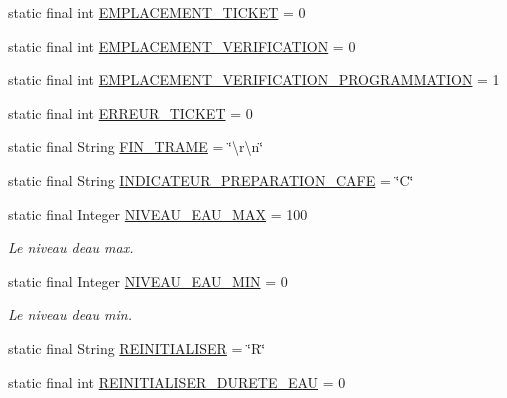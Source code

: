 \begin{DoxyCompactItemize}
\item 
static final int \hyperlink{classcom_1_1example_1_1ekawa_1_1_protocole_a6250b8095974b868336c880dc5c68f7f}{E\+M\+P\+L\+A\+C\+E\+M\+E\+N\+T\+\_\+\+T\+I\+C\+K\+ET} = 0
\item 
static final int \hyperlink{classcom_1_1example_1_1ekawa_1_1_protocole_ae76a20c0852f58c7dd77110816d8d809}{E\+M\+P\+L\+A\+C\+E\+M\+E\+N\+T\+\_\+\+V\+E\+R\+I\+F\+I\+C\+A\+T\+I\+ON} = 0
\item 
static final int \hyperlink{classcom_1_1example_1_1ekawa_1_1_protocole_aab437189a20d6f6447262ed50c666bde}{E\+M\+P\+L\+A\+C\+E\+M\+E\+N\+T\+\_\+\+V\+E\+R\+I\+F\+I\+C\+A\+T\+I\+O\+N\+\_\+\+P\+R\+O\+G\+R\+A\+M\+M\+A\+T\+I\+ON} = 1
\item 
static final int \hyperlink{classcom_1_1example_1_1ekawa_1_1_protocole_a18dec2fc4aa359cbcb7a7fe04ea5614a}{E\+R\+R\+E\+U\+R\+\_\+\+T\+I\+C\+K\+ET} = 0
\item 
static final String \hyperlink{classcom_1_1example_1_1ekawa_1_1_protocole_aece1e2c0e4110c3d91fb69da213e847f}{F\+I\+N\+\_\+\+T\+R\+A\+ME} = \char`\"{}\textbackslash{}r\textbackslash{}n\char`\"{}
\item 
static final String \hyperlink{classcom_1_1example_1_1ekawa_1_1_protocole_acb81150b5809d8635dd3301fa376a1d6}{I\+N\+D\+I\+C\+A\+T\+E\+U\+R\+\_\+\+P\+R\+E\+P\+A\+R\+A\+T\+I\+O\+N\+\_\+\+C\+A\+FE} = \char`\"{}C\char`\"{}
\item 
static final Integer \hyperlink{classcom_1_1example_1_1ekawa_1_1_protocole_a4318fa7c5638fd5da231029d1e2e9c99}{N\+I\+V\+E\+A\+U\+\_\+\+E\+A\+U\+\_\+\+M\+AX} = 100
\begin{DoxyCompactList}\small\item\em Le niveau d\textquotesingle{}eau max. \end{DoxyCompactList}\item 
static final Integer \hyperlink{classcom_1_1example_1_1ekawa_1_1_protocole_abba816d4dfe88be3a873669f2056aecc}{N\+I\+V\+E\+A\+U\+\_\+\+E\+A\+U\+\_\+\+M\+IN} = 0
\begin{DoxyCompactList}\small\item\em Le niveau d\textquotesingle{}eau min. \end{DoxyCompactList}\item 
static final String \hyperlink{classcom_1_1example_1_1ekawa_1_1_protocole_add67f8989ac6672f498b8c9f085cd445}{R\+E\+I\+N\+I\+T\+I\+A\+L\+I\+S\+ER} = \char`\"{}R\char`\"{}
\item 
static final int \hyperlink{classcom_1_1example_1_1ekawa_1_1_protocole_ad0aa6e75515c4a47cf40a32ef5d88928}{R\+E\+I\+N\+I\+T\+I\+A\+L\+I\+S\+E\+R\+\_\+\+D\+U\+R\+E\+T\+E\+\_\+\+E\+AU} = 0

\end{DoxyCompactItemize}
